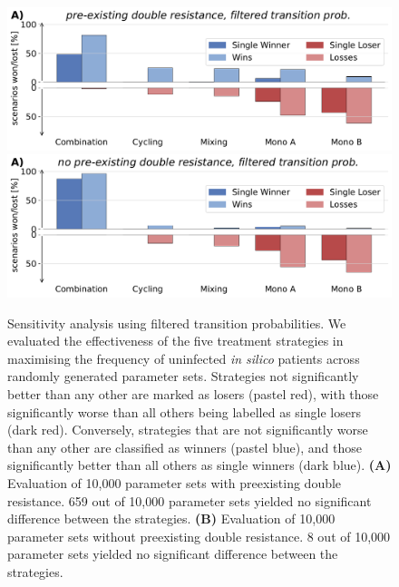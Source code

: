 \begin{figure}[p]
    \centering

        \includegraphics[width = \linewidth]{supplementary_1/figures/wins_and_losses_clean_preexisting.pdf}
        \includegraphics[width = \linewidth]{supplementary_1/figures/wins_and_losses_clean_no_preex.pdf}
      \caption{
            Sensitivity analysis using filtered transition probabilities.
            We evaluated the effectiveness of the five treatment strategies in maximising the frequency of uninfected \textit{in silico} patients across randomly generated parameter sets.
            Strategies not significantly better than any other are marked as losers (pastel red), with those significantly worse than all others being labelled as single losers (dark red). 
            Conversely, strategies that are not significantly worse than any other are classified as winners (pastel blue), and those significantly better than all others as single winners (dark blue).  
            \textbf{(A)} Evaluation of 10,000 parameter sets with preexisting double resistance. 659 out of 10,000 parameter sets yielded no significant difference between the strategies.
            \textbf{(B)} Evaluation of 10,000 parameter sets without preexisting double resistance. 8 out of 10,000 parameter sets yielded no significant difference between the strategies.
            }
        \label{fig:senstivity_clean}
\end{figure}
